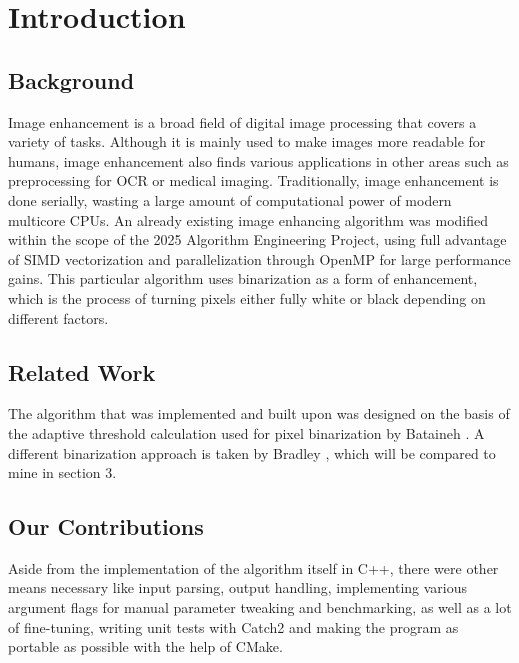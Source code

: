 \documentclass[sigconf]{acmart}
\begin{document}
\let\thefootnote\relax{}


\section{Introduction}

\sloppy
\subsection{Background}
Image enhancement is a broad field of digital image processing that covers a variety of tasks. Although it is mainly used to make images more readable for humans, image enhancement also finds various applications in other areas such as preprocessing for OCR or medical imaging. Traditionally, image enhancement is done serially, wasting a large amount of computational power of modern multicore CPUs. An already existing image enhancing algorithm was modified within the scope of the 2025 Algorithm Engineering Project, using full advantage of SIMD vectorization and parallelization through OpenMP for large performance gains. This particular algorithm uses binarization as a form of enhancement, which is the process of turning pixels either fully white or black depending on different factors.

\subsection{Related Work}
The algorithm that was implemented and built upon was designed on the basis of the adaptive threshold calculation used for pixel binarization by Bataineh \cite{Bataineh2011}. A different binarization approach is taken by Bradley \cite{Bradley2007}, which will be compared to mine in section 3.

\subsection{Our Contributions}
Aside from the implementation of the algorithm itself in C++, there were other means necessary like input parsing, output handling, implementing various argument flags for manual parameter tweaking and benchmarking, as well as a lot of fine-tuning, writing unit tests with Catch2 and making the program as portable as possible with the help of CMake.
\end{document}
